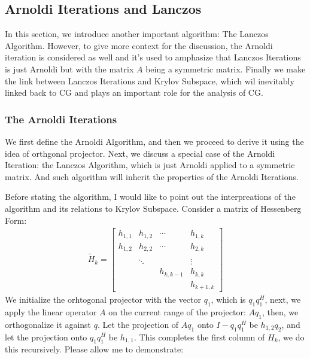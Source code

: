 \documentclass[]{article}
\theoremstyle{definition}
\begin{document}
    \subsection{Arnoldi Iterations and Lanczos}
        In this section, we introduce another important algorithm: The Lanczos Algorithm. However, to give more context for the discussion, the Arnoldi iteration is considered as well and it's used to amphasize that Lanczos Iterations is just Arnoldi but with the matrix $A$ being a symmetric matrix. Finally we make the link between Lanczos Iterations and Krylov Subspace, which wil inevitably linked back to CG and plays an important role for the analysis of CG. 
        \subsubsection{The Arnoldi Iterations}
            We first define the Arnoldi Algorithm, and then we proceed to derive it using the idea of orthgonal projector. Next, we discuss a special case of the Arnoldi Iteration: the Lanczos Algorithm, which is just Arnoldi applied to a symmetric matrix. And such algorithm will inherit the properties of the Arnoldi Iterations. 
            \par
            Before stating the algorithm, I would like to point out the interpreations of the algorithm and its relations to Krylov Subspace. Consider a matrix of Hessenberg Form:
            \begin{align}
                \tilde{H}_k = 
                \begin{bmatrix}
                    h_{1, 1} & h_{1, 2} & \cdots & h_{1, k} 
                    \\
                    h_{1, 2} & h_{2, 2} & \cdots & h_{2, k}
                    \\
                    \\
                    & \ddots & &\vdots
                    \\
                    & & h_{k, k - 1}& h_{k, k}
                    \\
                    & & & h_{k + 1, k}
                \end{bmatrix}
            \end{align}
            We initialize the orhtogonal projector with the vector $q_1$, which is $q_1q_1^H$, next, we apply the linear operator $A$ on the current range of the projector: $Aq_1$, then, we orthogonalize it against $q$. Let the projection of $Aq_1$ onto $I - q_1q_1^H$ be $h_{1, 2}q_2$, and let the projection onto $q_1q_1^H$ be $h_{1,1}$. This completes the first column of $H_k$, we do this recursively. Please allow me to demonstrate: 
\end{document}
